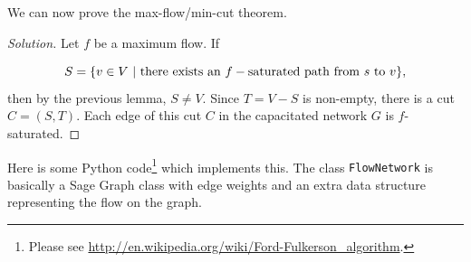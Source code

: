 We can now prove the max-flow/min-cut theorem.

\begin{proof}[Solution]
Let $f$ be a maximum flow.
If

\[
S = \{v\in V\ |\ {\rm there\ exists\ an\ }f-{\rm saturated\ path\
  from\ }s\ {\rm to\ }v\},
\]
then by the previous lemma, $S\not= V$.
Since $T=V-S$ is non-empty, there is a cut $C=(S,T)$.
Each edge of this cut $C$ in the capacitated network $G$ is
$f$-saturated.

\end{proof}

Here is some Python code\footnote{Please see
\url{http://en.wikipedia.org/wiki/Ford-Fulkerson_algorithm}.}
which implements this. The class {\tt FlowNetwork} is basically a Sage
Graph class with edge weights and an extra data structure representing
the flow on the graph.

